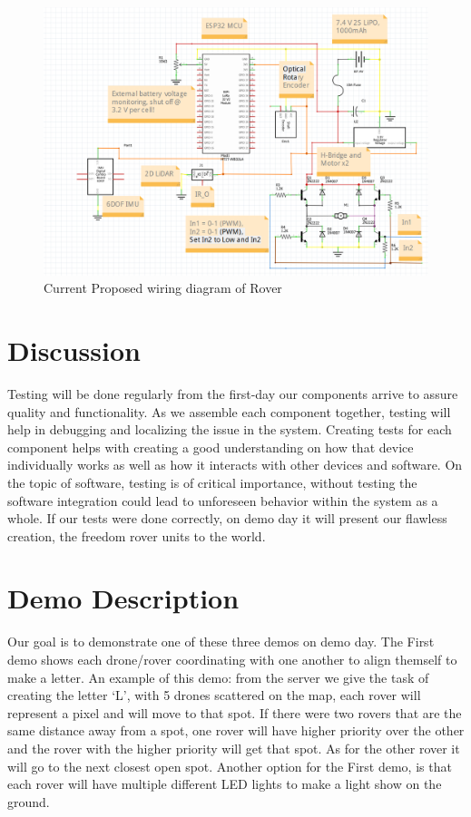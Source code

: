 \documentclass[conference]{IEEEtran}
\begin{document}
\begin{figure}
	\includegraphics[width=\linewidth]{RoverWiringSchematic.png}
	\caption{Current Proposed wiring diagram of Rover}
\end{figure}

\section{Discussion}
Testing will be done regularly from the first-day our components arrive to assure quality and functionality. As we assemble each component together, testing will help in debugging and localizing the issue in the system. Creating tests for each component helps with creating a good understanding on how that device individually works as well as how it interacts with other devices and software. On the topic of software, testing is of critical importance, without testing the software integration could lead to unforeseen behavior within the system as a whole. If our tests were done correctly, on demo day it will present our flawless creation, the freedom rover units to the world.
\section{Demo Description} 
Our goal is to demonstrate one of these three demos on demo day. The First demo shows each drone/rover coordinating with one another to align themself to make a letter. An example of this demo: from the server we give the task of creating the letter ‘L’, with 5 drones scattered on the map, each rover will represent a pixel and will move to that spot. If there were two rovers that are the same distance away from a spot, one rover will have higher priority over the other and the rover with the higher priority will get that spot. As for the other rover it will go to the next closest open spot. Another option for the First demo, is that each rover will have multiple different LED lights to make a light show on the ground.
\end{document}
